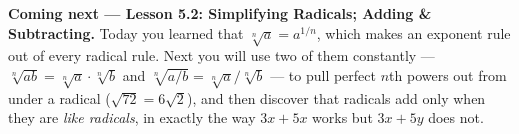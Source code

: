 \documentclass[10pt]{article}
\begin{document}
\begin{spiralbox}
\textbf{Coming next --- Lesson 5.2: Simplifying Radicals; Adding \& Subtracting.} Today you learned
that $\sqrt[n]{a}=a^{1/n}$, which makes an exponent rule out of every radical rule. Next you will use
two of them constantly --- $\sqrt[n]{ab}=\sqrt[n]{a}\cdot\sqrt[n]{b}$ and
$\sqrt[n]{a/b}=\sqrt[n]{a}\big/\sqrt[n]{b}$ --- to pull perfect $n$th powers out from under a
radical ($\sqrt{72}=6\sqrt{2}$), and then discover that radicals add only when they are
\emph{like radicals}, in exactly the way $3x+5x$ works but $3x+5y$ does not.
\end{spiralbox}
\end{document}

